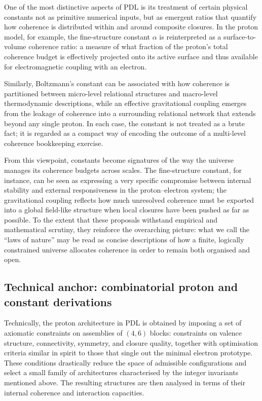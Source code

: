 \documentclass[11pt,a4paper]{article}
\theoremstyle{definition}
\begin{document}
One of the most distinctive aspects of PDL is its treatment of certain physical constants not as primitive numerical inputs, but as emergent ratios that quantify how coherence is distributed within and around composite closures.\cite{Laubscher_Alpha_v2_2024,Laubscher_Exponent18_v2_2024,Laubscher_UniversalCoherenceLeakage_2024} In the proton model, for example, the fine-structure constant \(\alpha\) is reinterpreted as a surface-to-volume coherence ratio: a measure of what fraction of the proton’s total coherence budget is effectively projected onto its active surface and thus available for electromagnetic coupling with an electron.\cite{Laubscher_Alpha_v2_2024,Laubscher_Born_Golden_v2_2024}

Similarly, Boltzmann’s constant can be associated with how coherence is partitioned between micro-level relational structures and macro-level thermodynamic descriptions, while an effective gravitational coupling emerges from the leakage of coherence into a surrounding relational network that extends beyond any single proton.\cite{Laubscher_UniversalCoherenceLeakage_2024,Laubscher_EffectiveFields_2024,Laubscher_PDL_Position_2024} In each case, the constant is not treated as a brute fact; it is regarded as a compact way of encoding the outcome of a multi-level coherence bookkeeping exercise.

From this viewpoint, constants become signatures of the way the universe manages its coherence budgets across scales. The fine-structure constant, for instance, can be seen as expressing a very specific compromise between internal stability and external responsiveness in the proton–electron system; the gravitational coupling reflects how much unresolved coherence must be exported into a global field-like structure when local closures have been pushed as far as possible.\cite{Laubscher_Alpha_v2_2024,Laubscher_UniversalCoherenceLeakage_2024} To the extent that these proposals withstand empirical and mathematical scrutiny, they reinforce the overarching picture: what we call the ``laws of nature'' may be read as concise descriptions of how a finite, logically constrained universe allocates coherence in order to remain both organised and open.

\subsection{Technical anchor: combinatorial proton and constant derivations}

Technically, the proton architecture in PDL is obtained by imposing a set of axiomatic constraints on assemblies of \((4,6)\) blocks: constraints on valence structure, connectivity, symmetry, and closure quality, together with optimisation criteria similar in spirit to those that single out the minimal electron prototype.\cite{Laubscher_ProtonArch_v1_2024,Laubscher_ProtonArch_v2_2024} These conditions drastically reduce the space of admissible configurations and select a small family of architectures characterised by the integer invariants mentioned above. The resulting structures are then analysed in terms of their internal coherence and interaction capacities.
\end{document}
